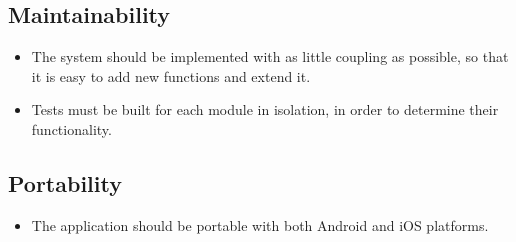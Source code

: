 \subsection{Maintainability}
\begin{itemize}
    \item The system should be implemented with as little coupling as possible, so that it is easy to add new functions and extend it.
    \item Tests must be built for each module in isolation, in order to determine their functionality. 
\end{itemize}
\subsection{Portability}
    \begin{itemize}
        \item The application should be portable with both Android and iOS platforms.
    \end{itemize}